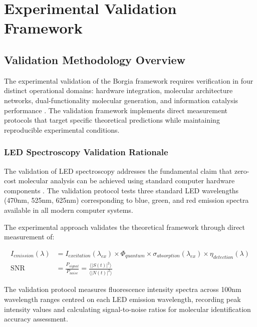 \documentclass[12pt,a4paper]{article}
\begin{document}
\section{Experimental Validation Framework}

\subsection{Validation Methodology Overview}

The experimental validation of the Borgia framework requires verification in four distinct operational domains: hardware integration, molecular architecture networks, dual-functionality molecular generation, and information catalysis performance \cite{sterling2015principles}. The validation framework implements direct measurement protocols that target specific theoretical predictions while maintaining reproducible experimental conditions.


\subsubsection{LED Spectroscopy Validation Rationale}

The validation of LED spectroscopy addresses the fundamental claim that zero-cost molecular analysis can be achieved using standard computer hardware components \cite{lakowicz2006principles}. The validation protocol tests three standard LED wavelengths (470nm, 525nm, 625nm) corresponding to blue, green, and red emission spectra available in all modern computer systems.

The experimental approach validates the theoretical framework through direct measurement of:

\begin{align}
I_{emission}(\lambda) &= I_{excitation}(\lambda_{ex}) \times \Phi_{quantum} \times \sigma_{absorption}(\lambda_{ex}) \times \eta_{detection}(\lambda) \\
\text{SNR} &= \frac{P_{signal}}{P_{noise}} = \frac{\langle |S(t)|^2 \rangle}{\langle |N(t)|^2 \rangle}
\end{align}

The validation protocol measures fluorescence intensity spectra across 100nm wavelength ranges centred on each LED emission wavelength, recording peak intensity values and calculating signal-to-noise ratios for molecular identification accuracy assessment.
\end{document}
